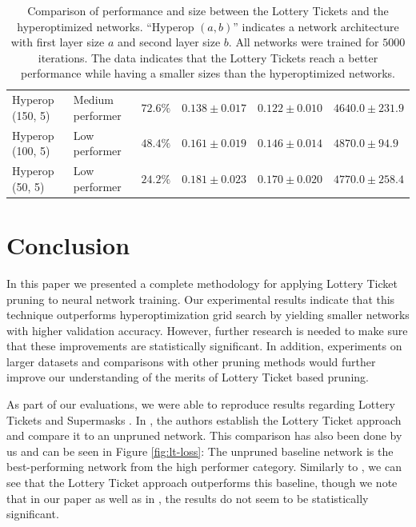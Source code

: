 \documentclass[12pt,final,twoside]{article}
\theoremstyle{plain}
\theoremstyle{definition}
\theoremstyle{remark}
\theoremstyle{named}
\begin{document}
\begin{table}[p]
{\begin{tabular}{llllll}
 Hyperop (150, 5) &  Medium performer &   $72.6\%$ &    $0.138 \pm 0.017$ &       $0.122 \pm 0.010$ &                   $4640.0 \pm 231.9$ \\
 Hyperop (100, 5) &  Low performer &   $48.4\%$ &    $0.161 \pm 0.019$ &       $0.146 \pm 0.014$ &                    $4870.0 \pm 94.9$ \\
 Hyperop (50, 5) &  Low performer &   $24.2\%$  &    $0.181 \pm 0.023$ &       $0.170 \pm 0.020$ &                   $4770.0 \pm 258.4$\\
\bottomrule
\end{tabular}
}
\caption{Comparison of performance and size between the Lottery Tickets and the hyperoptimized networks. ``Hyperop $(a, b)$'' indicates a network architecture with first layer size $a$ and second layer size $b$. All networks were trained for $5000$ iterations. The data indicates that the Lottery Tickets reach a better performance while having a smaller sizes than the hyperoptimized networks. }
\label{tab:lt-data}
\end{table}

\section{Conclusion}

In this paper we presented a complete methodology for applying Lottery Ticket pruning to neural network training. Our experimental results indicate that this technique outperforms hyperoptimization grid search by yielding smaller networks with higher validation accuracy. However, further research is needed to make sure that these improvements are statistically significant. In addition, experiments on larger datasets and comparisons with other pruning methods would further improve our understanding of the merits of Lottery Ticket based pruning.

As part of our evaluations, we were able to reproduce results regarding Lottery Tickets \cite{lottery} and Supermasks \cite{supermask}. In \cite{lottery}, the authors establish the Lottery Ticket approach and compare it to an unpruned network. This comparison has also been done by us and can be seen in Figure \ref{fig:lt-loss}: The unpruned baseline network is the best-performing network from the high performer category. Similarly to \cite{lottery}, we can see that the Lottery Ticket approach outperforms this baseline, though we note that in our paper as well as in \cite{lottery}, the results do not seem to be statistically significant.
\end{document}
